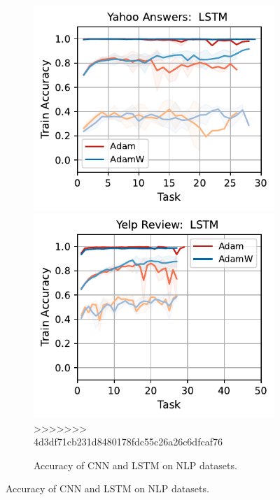 \begin{figure}[htb!]
{\begin{figure}[htb!]
{        \includegraphics[width=\textwidth]{figs/Accuracy/nlp/lstm/yahoo_answers_50.pdf}
        \includegraphics[width=\textwidth]{figs/Accuracy/nlp/lstm/yelp_review_full_50.pdf}
        >>>>>>> 4d3df71cb231d8480178fdc55c26a26c6dfcaf76
    }
    \caption{Accuracy of CNN and LSTM on NLP datasets.}
    \label{fig:nlp_cnn_lstm}
\end{figure}

}
\end{figure}
